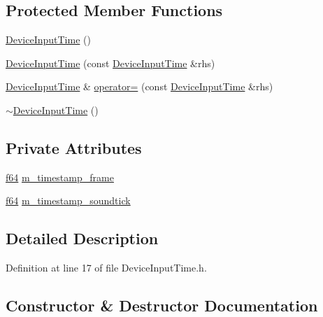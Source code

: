 \subsection*{Protected Member Functions}
\begin{DoxyCompactItemize}
\item 
\mbox{\hyperlink{classnjli_1_1_device_input_time_a2c5cc0a5ead654efbbce74d08f490fa5}{Device\+Input\+Time}} ()
\item 
\mbox{\hyperlink{classnjli_1_1_device_input_time_af34c8fdf7626c83b3a106984c6218332}{Device\+Input\+Time}} (const \mbox{\hyperlink{classnjli_1_1_device_input_time}{Device\+Input\+Time}} \&rhs)
\item 
\mbox{\hyperlink{classnjli_1_1_device_input_time}{Device\+Input\+Time}} \& \mbox{\hyperlink{classnjli_1_1_device_input_time_ab1ca58d01db67a7ca5eb57bbbe07d929}{operator=}} (const \mbox{\hyperlink{classnjli_1_1_device_input_time}{Device\+Input\+Time}} \&rhs)
\item 
\mbox{\hyperlink{classnjli_1_1_device_input_time_a2c421a428c0d4fdc1311d91b7001f9fc}{$\sim$\+Device\+Input\+Time}} ()
\end{DoxyCompactItemize}
\subsection*{Private Attributes}
\begin{DoxyCompactItemize}
\item 
\mbox{\hyperlink{_util_8h_a94dab5770726ccbef8c7d026cfbdf8e5}{f64}} \mbox{\hyperlink{classnjli_1_1_device_input_time_a798d29d739522cad83bd37986ed15a20}{m\+\_\+timestamp\+\_\+frame}}
\item 
\mbox{\hyperlink{_util_8h_a94dab5770726ccbef8c7d026cfbdf8e5}{f64}} \mbox{\hyperlink{classnjli_1_1_device_input_time_a20e05f326dd3a3836a549cba6b536e85}{m\+\_\+timestamp\+\_\+soundtick}}
\end{DoxyCompactItemize}


\subsection{Detailed Description}


Definition at line 17 of file Device\+Input\+Time.\+h.



\subsection{Constructor \& Destructor Documentation}
\mbox{\label{classnjli_1_1_device_input_time_a2c5cc0a5ead654efbbce74d08f490fa5}} 
